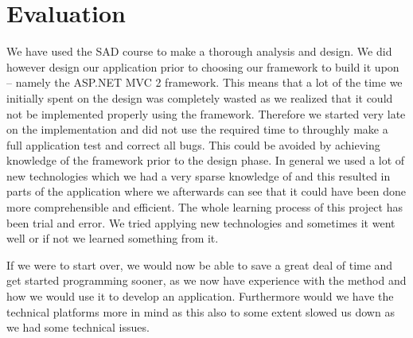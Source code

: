 \chapter{Evaluation}
\label{chap:discussion}
We have used the SAD course to make a thorough analysis and design.
We did however design our application prior to choosing our framework to build it upon -- namely the ASP.NET MVC 2 framework.
This means that a lot of the time we initially spent on the design was completely wasted as we realized that it could not be implemented properly using the framework.
Therefore we started very late on the implementation and did not use the required time to throughly make a full application test and correct all bugs.
This could be avoided by achieving knowledge of the framework prior to the design phase. 
In general we used a lot of new technologies which we had a very sparse knowledge of and this resulted in parts of the application where we afterwards can see that it could have been done more comprehensible and efficient.
The whole learning process of this project has been trial and error.
We tried applying new technologies and sometimes it went well or if not we learned something from it.

If we were to start over, we would now be able to save a great deal of time and get started programming sooner, as we now have experience with the \ooad{} method and how we would use it to develop an application. Furthermore would we have the technical platforms more in mind as this also to some extent slowed us down as we had some technical issues.

